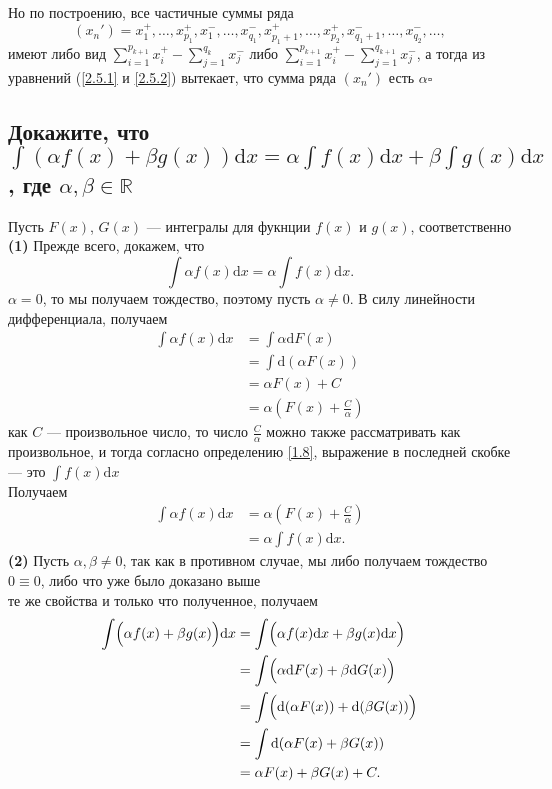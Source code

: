 \documentclass[a4paper]{article}
\newcommand{\qed}{\hfill$\square$}
\begin{document}
Но по построению, все частичные суммы ряда 
$$
(x_n') = x_1^+, \ldots, x_{p_1}^+, x_1^-, \ldots, x_{q_1}^-, x_{p_1+1}^+, \ldots, x_{p_2}^+, x_{q_1+1}^-, \ldots, x_{q_2}^-, \ldots,
$$
имеют либо вид $\displaystyle\sum_{i=1}^{p_{k+1}}x_i^+ - \sum_{j=1}^{q_k}x_j^-$ либо $\displaystyle\sum_{i=1}^{p_{k+1}}x_i^+ - \sum_{j=1}^{q_{k+1}}x_j^-$, а тогда из уравнений (\ref{2.5.1} и \ref{2.5.2}) вытекает, что сумма ряда $(x_n')$ есть $\alpha$\qed

\subsection{Докажите, что $\displaystyle\int\left(\alpha f(x)+\beta g(x)\right)\mathrm{d}x=\alpha\int f(x)\mathrm{d}x+\beta\int g(x)\mathrm{d}x$, где $\alpha,\beta\in\mathbb{R}$}
\label{2.6}
Пусть $F(x)$, $G(x)$ — интегралы для фукнции $f(x)$ и $g(x)$, соответственно\\[2mm]
\indent\textbf{(1) }Прежде всего, докажем, что 
$$
\int \alpha f(x) \mathrm{d}x = \alpha \int f(x) \mathrm{d}x.
$$
 $\alpha = 0$, то мы получаем тождество, поэтому пусть $\alpha \ne 0.$ В силу линейности дифференциала, получаем
$$\begin{aligned}
\int \alpha f(x) \mathrm{d}x &= \int \alpha \mathrm{d}F(x) \\
&= \int \mathrm{d}(\alpha F(x)) \\
&= \alpha F(x) + C \\
&= \alpha \left( F(x) + \frac{C}{\alpha} \right)
\end{aligned}$$
 как $C$ — произвольное число, то число $\displaystyle\frac{C}{\alpha}$ можно также рассматривать как произвольное, и тогда согласно определению \ref{1.8}, выражение в последней скобке — это $\displaystyle\int f(x) \mathrm{d}x$\\[2mm]
Получаем
$$\begin{aligned}
\int \alpha f(x) \mathrm{d}x &=\alpha \left( F(x) + \frac{C}{\alpha} \right) \\
& = \alpha \int f(x) \mathrm{d}x.
\end{aligned}$$
\indent\textbf{(2) }Пусть $\alpha, \beta\ne 0$, так как в противном случае, мы либо получаем тождество $0 \equiv 0$, либо что уже было доказано выше\\[2mm]
 те же свойства и только что полученное, получаем
$$\begin{aligned}
\int \Bigl(\alpha f(x) + \beta g(x) \Bigr) \mathrm{d}x &= \int\Bigl( \alpha f(x) \mathrm{d}x + \beta g(x) \mathrm{d}x \Bigr) \\
&= \int \Bigl( \alpha \mathrm{d}F(x) + \beta \mathrm{d}G(x) \Bigr) \\
&= \int \Bigl( \mathrm{d}(\alpha F(x)) + \mathrm{d}(\beta G(x))  \Bigr) \\
&= \int \mathrm{d}(\alpha F(x) + \beta G(x)) \\
&= \alpha F(x) + \beta G(x) + C.
\end{aligned}$$
\end{document}
